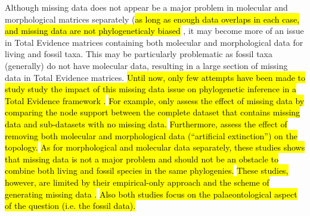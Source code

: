 \documentclass[12pt,letterpaper]{article}
\begin{document}
Although missing data does not appear be a major problem in molecular and morphological matrices separately (\hl{as long as enough data overlaps in each case, and missing data are not phylogeneticaly biased} \citep{wiensmissing2003,Wiens01102005,wiensmissing2006,wiensmissing2008,lemmonthe2009,Sanderson22072011,rouresite-specific2011,pattinsonphylogeny2014}, it may become more of an issue in Total Evidence matrices containing both molecular and morphological data for living and fossil taxa.
This may be particularly problematic as fossil taxa (generally) do not have molecular data, resulting in a large section of missing data in Total Evidence matrices.
\hl{Until now, only few attempts have been made to study study the impact of this missing data issue on phylogenetic inference in a Total Evidence framework \protect\citep[\hl{i.e. using combined molecular and morphological data}; e.g.][]{Wiens01102005,pattinsonphylogeny2014}.}
\hl{For example, \protect\cite{Wiens01102005} }\hl{only assess the effect of missing data by comparing the node support between the complete dataset that contains missing data and sub-datasets with no missing data.}
\hl{Furthermore, \protect\cite{pattinsonphylogeny2014} }\hl{assess the effect of removing both molecular and morphological data (``artificial extinction'') on the topology.}
\hl{As for morphological and molecular data separately, these studies shows that missing data is not a major problem and should not be an obstacle to combine both living and fossil species in the same phylogenies.}
\hl{These studies, however, are limited by their empirical-only approach \protect\citep{Wiens01102005} }\hl{and the scheme of generating missing data \protect\citep{pattinsonphylogeny2014}.}
\hl{Also both studies focus on the palaeontological aspect of the question (i.e. the fossil data).}
\end{document}
